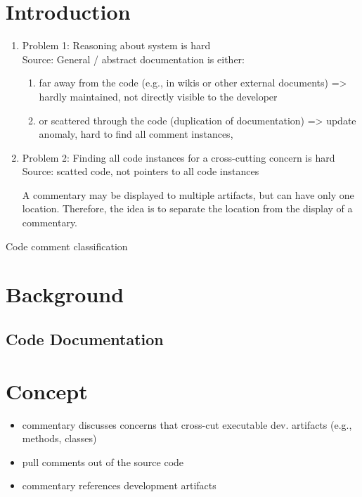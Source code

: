 
\section{Introduction}
\begin{enumerate}
	
\item  Problem 1: Reasoning about system is hard\\
Source: General / abstract documentation is either:
\begin{enumerate}
	\item far away from the code (e.g., in wikis or other external documents) => hardly maintained, not directly visible to the developer
	\item or scattered through the code (duplication of documentation) => update anomaly, hard to find all comment instances, 
\end{enumerate}

\item  Problem 2: Finding all code instances for a cross-cutting concern is hard\\
Source: scatted code, not pointers to all code instances



A commentary may be displayed to multiple artifacts, but can have only one location. 
Therefore, the idea is to separate the location from the display of a commentary.


\end{enumerate}


Code comment classification\cite{Pascarella2017ClassifyingCodeComments} 
\section{Background}

\subsection{Code Documentation}

\section{Concept}

\begin{itemize}
\item commentary discusses concerns that cross-cut executable dev. artifacts (e.g., methods, classes)
\item pull comments out of the source code 
\item commentary references development artifacts 
\end{itemize}

